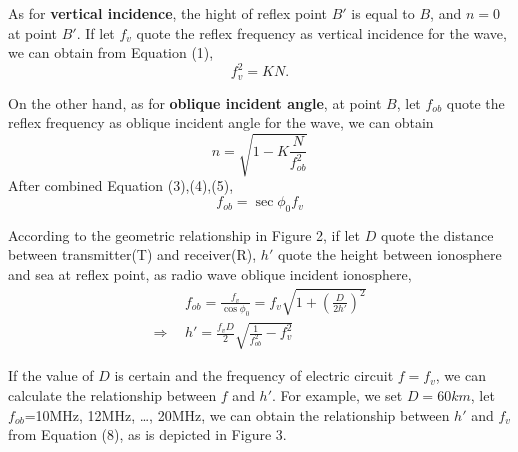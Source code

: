 \documentclass{mcmthesis}
\begin{document}
As for \textbf{vertical incidence}, the hight of reflex point $B'$ is equal to $B$, and $n = 0$ at point $B'$. If let $f_v$ quote the reflex frequency as vertical incidence for the wave, we can obtain from Equation (1), 
\begin{equation}
f_v^2 = KN.
\end{equation}

On the other hand, as for \textbf{oblique incident angle}, at point $B$, let $f_{ob}$ quote the reflex frequency as oblique incident angle for the wave, we can obtain 
\begin{equation}
n = \displaystyle\sqrt{1-K\displaystyle\frac{N}{f_{ob}^2}}
\end{equation}
After combined Equation (3),(4),(5), 
\begin{equation}
f_{ob} = \sec\phi_0 f_v
\end{equation}

According to the geometric relationship in Figure 2,
if let $D$ quote the distance between transmitter(T) and receiver(R), $h'$ quote the height between ionosphere and sea at reflex point, as radio wave oblique incident ionosphere, 
\begin{align}
&f_{ob} = \frac{f_v}{\cos \phi_0} = f_v\displaystyle\sqrt{1+\left( \frac{D}{2h'}\right)^2} \\ 
\Rightarrow ~~ & h'=\displaystyle\frac{f_v D}{2}\sqrt{\frac{1}{f_{ob}^2}-f_v^2} 
\end{align}

If the value of $D$ is certain and the frequency of electric circuit $f = f_{v}$,  we can calculate the relationship between $f$ and $h'$. For example, we set $D=60km$, let $f_{ob}$=10MHz, 12MHz, \ldots , 20MHz, we can obtain the relationship between $h'$ and $f_v$ from Equation (8), as is depicted in Figure 3. 
\end{document}
